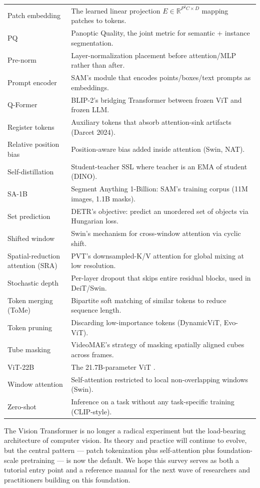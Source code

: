 \documentclass{article}
\begin{document}
\begin{table}[t]
\begin{tabular}{>{\raggedright\arraybackslash}p{0.2598\linewidth}
  >{\raggedright\arraybackslash}p{0.7402\linewidth}}
Patch embedding & The learned linear projection \(E \in \mathbb{R}^{P^2C \times D}\) mapping patches to tokens. \\
PQ & Panoptic Quality, the joint metric for semantic + instance segmentation. \\
Pre-norm & Layer-normalization placement before attention/MLP rather than after. \\
Prompt encoder & SAM's module that encodes points/boxes/text prompts as embeddings. \\
Q-Former & BLIP-2's bridging Transformer between frozen ViT and frozen LLM. \\
Register tokens & Auxiliary tokens that absorb attention-sink artifacts (Darcet 2024). \\
Relative position bias & Position-aware bias added inside attention (Swin, NAT). \\
Self-distillation & Student-teacher SSL where teacher is an EMA of student (DINO). \\
SA-1B & Segment Anything 1-Billion: SAM's training corpus (11M images, 1.1B masks). \\
Set prediction & DETR's objective: predict an unordered set of objects via Hungarian loss. \\
Shifted window & Swin's mechanism for cross-window attention via cyclic shift. \\
Spatial-reduction attention (SRA) & PVT's downsampled-K/V attention for global mixing at low resolution. \\
Stochastic depth & Per-layer dropout that skips entire residual blocks, used in DeiT/Swin. \\
Token merging (ToMe) & Bipartite soft matching of similar tokens to reduce sequence length. \\
Token pruning & Discarding low-importance tokens (DynamicViT, Evo-ViT). \\
Tube masking & VideoMAE's strategy of masking spatially aligned cubes across frames. \\
ViT-22B & The 21.7B-parameter ViT \citep{dehghani2023scalingvisiontrans}. \\
Window attention & Self-attention restricted to local non-overlapping windows (Swin). \\
Zero-shot & Inference on a task without any task-specific training (CLIP-style). \\
\end{tabular}
\end{table}

The Vision Transformer is no longer a radical experiment but the load-bearing architecture of computer vision. Its theory and practice will continue to evolve, but the central pattern --- patch tokenization plus self-attention plus foundation-scale pretraining --- is now the default. We hope this survey serves as both a tutorial entry point and a reference manual for the next wave of researchers and practitioners building on this foundation.
\end{document}
